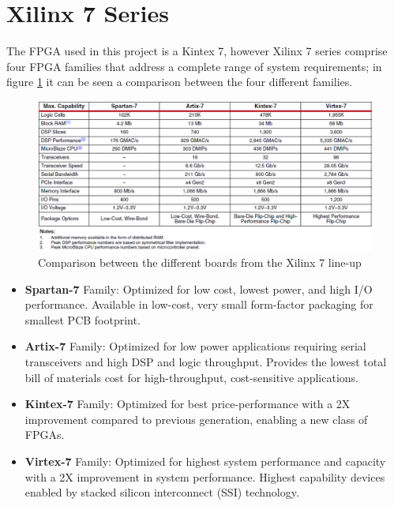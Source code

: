 \section{Xilinx 7 Series}
\noindent The FPGA used in this project is a Kintex 7, however Xilinx 7 series comprise four FPGA families that address a complete range of system requirements; in figure \ref{fig:kintex72} it can be seen a comparison between the four different families.
\begin{figure}[H]
	\centering
	\includegraphics[width=0.9\linewidth]{IMG/ch3/KINTEX72}
	\caption{Comparison between the different boards from the Xilinx 7 line-up}
	\label{fig:kintex72}
\end{figure}
\begin{itemize}
	\item  \textbf{Spartan-7} Family: Optimized for low cost, lowest power, and high
	I/O performance. Available in low-cost, very small form-factor
	packaging for smallest PCB footprint.
	\item \textbf{Artix-7} Family: Optimized for low power applications requiring serial
	transceivers and high DSP and logic throughput. Provides the lowest
	total bill of materials cost for high-throughput, cost-sensitive
	applications.
	\item \textbf{Kintex-7} Family: Optimized for best price-performance with a 2X
	improvement compared to previous generation, enabling a new class
	of FPGAs.
	\item \textbf{Virtex-7} Family: Optimized for highest system performance and
	capacity with a 2X improvement in system performance. Highest
	capability devices enabled by stacked silicon interconnect (SSI)
	technology.
\end{itemize}
